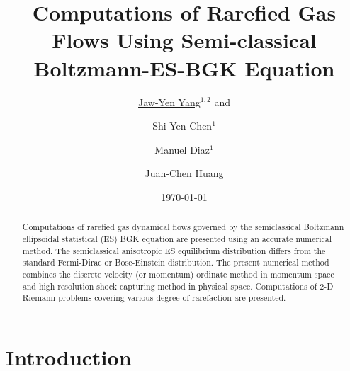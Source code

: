 \documentclass[twoside,twocolumn,prc,floats,amsmath,amssymb]{revtex4} %
\begin{document}
\title{Computations of Rarefied Gas Flows Using Semi-classical Boltzmann-ES-BGK Equation}
\author{\underline{Jaw-Yen Yang$^{1,2}$} and} %
\author{ Shi-Yen Chen$^{1}$} %
\author{ Manuel Diaz$^{1}$}
\author{Juan-Chen Huang}
\date{\today}

\begin{abstract}
Computations of rarefied gas dynamical flows governed by the semiclassical Boltzmann ellipsoidal statistical (ES) BGK equation are presented using an accurate numerical method.  The semiclassical anisotropic ES equilibrium distribution differs from the standard Fermi-Dirac or Bose-Einstein distribution.  The present numerical method combines the discrete velocity (or momentum) ordinate method in momentum space and high resolution shock capturing method in physical space.  Computations of 2-D Riemann problems covering various degree of rarefaction are presented.  
\end{abstract}


\maketitle

\section{Introduction}

\label{sec:1}   
\end{document}
